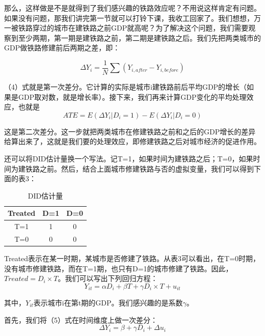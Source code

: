 \documentclass[cn,12pt,math=newtx,citestyle=gb7714-2015,bibstyle=gb7714-2015]{elegantbook}
\begin{document}
	那么，这样做是不是就得到了我们感兴趣的铁路效应呢？不用说这样肯定有问题。如果没有问题，那我们讲完第一节就可以打铃下课，我收工回家了。我们想想，万一被铁路穿过的城市在建铁路之前GDP就高呢？为了解决这个问题，我们需要观察到至少两期，第一期是建铁路之前，第二期是建铁路之后。我们先把两类城市的GDP做铁路修建前后两期之差，即：
	
	\begin{equation}
		\Delta{Y}_i=\frac{1}{N}\sum{(Y_{i,after}-Y_{i,before})}
	\end{equation}
	
	（4）式就是第一次差分。它计算的实际是城市i建铁路前后平均GDP的增长（如果是GDP取对数，就是增长率）。接下来，我们再来计算GDP变化的平均处理效应，也就是
	\begin{equation}
		ATE=E(\Delta{Y}_i\big|D_i=1)-E(\Delta{Y}_i\big|D_i=0)
	\end{equation}
	
	这是第二次差分。这一步就把两类城市在修建铁路之前和之后的GDP增长的差异给算出来了，这就是我们要的处理效应，即修建铁路之后对城市经济的促进作用。
	
	还可以将DID估计量换一个写法。记T=1，如果时间为建铁路之后；T=0，如果时间为建铁路之前。然后，结合上面城市修建铁路与否的虚拟变量，我们可以得到下面的表3：
	
	\begin{center}
		\begin{table}[!h]
			\caption{DID估计量}\label{tab:digit}
			\begin{center}
				\begin{tabular}{|c|c|c|}
					\hline
					Treated&D=1&D=0\\
					\hline
					T=1&1&0\\
					\hline
					T=0&0&0\\
					\hline
				\end{tabular}
			\end{center}
		\end{table}
	\end{center}
	
	Treated表示在某一时期，某城市是否修建了铁路。从表3可以看出，在T=0时期，没有城市修建铁路，而在T=1期，也只有D=1的城市修建了铁路。因此，$Treated=D_i\times{T}$。我们可以写出下列回归方程：
	\begin{equation}
		Y_{it}=\alpha{D}_i+\beta{T}+\gamma{D_i\times{T}}+u_{it}
	\end{equation}
	
	其中，$Y_{it}$表示城市i在第t期的GDP。我们感兴趣的是系数$\gamma$。
	
	首先，我们将（5）式在时间维度上做一次差分：
	\begin{equation}
		\Delta{Y}_i=\beta+\gamma{D}_i+\Delta{u}_i
	\end{equation}
	
\end{document}
